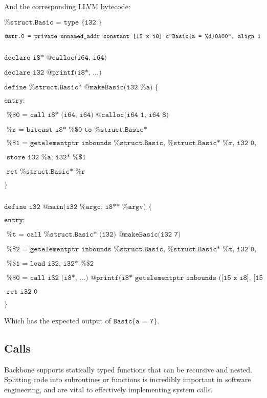 \documentclass[journal=jacsat, manuscript=article]{achemso}
\begin{document}
\normalsize
And the corresponding LLVM bytecode:

\footnotesize{
$\texttt{\%struct.Basic = type \{ i32 \}}$

$\texttt{@str.0 = private unnamed\_addr constant [15 x i8] c"Basic\{a = \%d\}\\0A\\00", align 1}$

$\texttt{}$

$\texttt{declare i8* @calloc(i64, i64)}$

$\texttt{declare i32 @printf(i8*, ...)}$

$\texttt{define \%struct.Basic* @makeBasic(i32 \%a) \{}$

$\texttt{entry:}$
  
$\texttt{  \%\$0 = call i8* (i64, i64) @calloc(i64 1, i64 8)}$
  
$\texttt{  \%r = bitcast i8* \%\$0 to \%struct.Basic*}$
  
$\texttt{  \%\$1 = getelementptr inbounds \%struct.Basic, \%struct.Basic* \%r, i32 0, i32 0}$
  
$\texttt{  store i32 \%a, i32* \%\$1}$
  
$\texttt{  ret \%struct.Basic* \%r}$

$\texttt{\}}$

$\texttt{}$

$\texttt{define i32 @main(i32 \%argc, i8** \%argv) \{}$

$\texttt{entry:}$
  
$\texttt{  \%t = call \%struct.Basic* (i32) @makeBasic(i32 7)}$
  
$\texttt{  \%\$2 = getelementptr inbounds \%struct.Basic, \%struct.Basic* \%t, i32 0, i32 0}$
  
$\texttt{  \%\$1 = load i32, i32* \%\$2}$
  
$\texttt{  \%\$0 = call i32 (i8*, ...) @printf(i8* getelementptr inbounds ([15 x i8], [15 x i8]* @str.0, i64 0, i64 0),
i32 \%\$1)}$

$\texttt{  ret i32 0}$

$\texttt{\}}$
}

\normalsize

Which has the expected output of $\texttt{Basic\{a = 7\}}$.

\subsection{Calls}

Backbone supports statically typed functions that can be recursive and nested. Splitting code into
subroutines or functions is incredibly important in software engineering, and are vital to effectively
implementing system calls.
\end{document}

